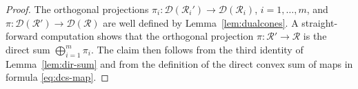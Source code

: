 \documentclass[a4paper,11pt,reqno]{amsart}
\newcommand{\cD}{\mathcal{D}}
\newcommand{\cR}{\mathcal{R}}
\theoremstyle{definition}
\theoremstyle{remark}
\numberwithin{equation}{section}
\begin{document}
%
\begin{proof}
The orthogonal projections $\pi_i:\cD(\cR_i')\to\cD(\cR_i)$, $i=1,\ldots,m$, 
and $\pi:\cD(\cR')\to\cD(\cR)$ are well defined by Lemma~\ref{lem:dualcones}. 
A straight-forward computation shows that the orthogonal projection 
$\pi:\cR'\to\cR$ is the direct sum $\bigoplus_{i=1}^m\pi_i$. The claim then 
follows from the third identity of Lemma~\ref{lem:dir-sum} and from the 
definition of the direct convex sum of maps in formula 
\eqref{eq:dcs-map}.
\end{proof}
%
%
\end{document}
